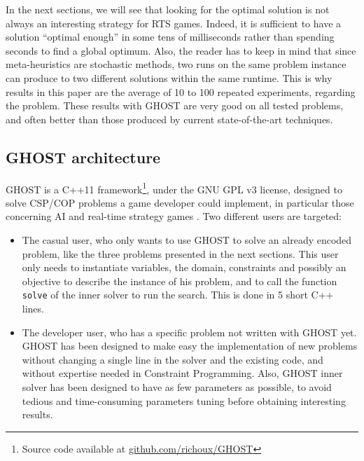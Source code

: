 \documentclass[journal]{IEEEtran}
\newcommand{\minormod}[1]{#1 \xspace}
\newcommand{\csp}{\textsc{CSP}\xspace}
\newcommand{\cop}{\textsc{COP}\xspace}
\newcommand{\ghost}{\textsc{GHOST}\xspace}
\begin{document}
In  the next  sections,  we  will see  that  looking  for the  optimal
solution is not always an  interesting strategy for RTS games. Indeed,
it is sufficient to have a solution ``optimal enough'' in some tens of
milliseconds   rather  than   spending  seconds   to  find   a  global
optimum. Also, the reader has to keep in mind that since meta-heuristics are
stochastic methods, two runs on the same  problem instance can produce
to  two different  solutions within  the  same runtime.   This is  why
results  in  this  paper  are  the  average  of  10  to  100  repeated
experiments,  regarding the  problem.  These  results with  \ghost are
very good on  all tested problems, and often  better than those produced 
by current state­-of­-the-­art techniques.

\subsection{\ghost architecture}

\ghost  is a  C++11 framework\footnote{Source  code available  at
  \href{https://github.com/richoux/GHOST}{github.com/richoux/GHOST}},
under  the  GNU  GPL  v3  license,  designed  to  solve  \minormod{\csp/\cop problems a game developer could implement, in particular those concerning AI and real-time strategy games}. Two different users are targeted:
\begin{itemize}
\item  The casual  user, who  only  wants to  use \ghost  to solve  an
  already encoded problem,  like the three problems  presented in the next
  sections.   This  user  only  needs to  instantiate  variables,  the
  domain,  constraints and possibly  an objective  to describe  the
  instance of his problem, and  to call the function \texttt{solve} of
  the inner solver to run the search. This is done in 5 short C++ lines.
\item The developer user, who has  a specific problem not written with
  \ghost yet.  \ghost  has been designed to make easy the implementation of
  new problems without changing a single line in  the solver and
  the  existing  code,  and  without expertise  needed  in  Constraint
  Programming.   Also, \ghost inner  solver has  been designed  to have  as few
  parameters  as   possible,  to  avoid  tedious   and  time-consuming
  parameters tuning before obtaining interesting results.
\end{itemize}
\end{document}
